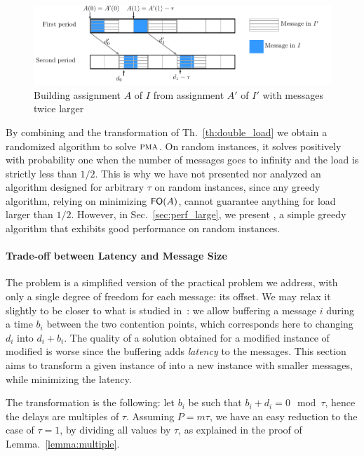 \documentclass[pdflatex,sn-mathphys,iicol]{sn-jnl}%
\theoremstyle{thmstyleone}%
\theoremstyle{thmstyletwo}%
\theoremstyle{thmstylethree}%
\begin{document}
\begin{figure}[h]
\begin{center}

\includegraphics[scale=0.7]{transfo2tau}
\end{center}
\caption{Building assignment $A$ of $I$ from assignment $A'$ of $I'$ with messages twice larger}
\label{fig:transf_2tau}
\end{figure}
 

By combining \greedyuniform and the transformation of Th.~\ref{th:double_load} we obtain a randomized algorithm to solve $\textsc{pma}$. On random instances, it solves \pma positively with probability one when the number of messages goes to infinity and the load is strictly less than $1/2$. This is why we have not presented nor analyzed an algorithm designed for arbitrary $\tau$ on random instances, since any greedy algorithm, relying on minimizing $\textsf{FO}(A)$, cannot guarantee anything for load larger than $1/2$. However, in Sec.~\ref{sec:perf_large}, we present \compactfit, a simple greedy algorithm that exhibits good performance on random instances.

\paragraph*{Trade-off between Latency and Message Size}

The problem \pma is a simplified version of the practical problem we address, with only a single degree of freedom for each message: its offset. We may relax it slightly to be closer to what is studied in~\cite{barth2018deterministic}: we allow buffering a message $i$ during a time $b_i$ between the two contention points, which corresponds here to changing $d_i$ into $d_i + b_i$. The quality of a solution obtained for a modified instance of \pma modified is worse since the buffering adds \emph{latency} to the messages. This section aims to transform a given instance of 
\pma into a new instance with smaller messages, while minimizing the latency.

The transformation is the following: let $b_i$ be such that 
 $b_i + d_i = 0 \mod \tau$, hence the delays are multiples of $\tau$. Assuming $P = m\tau$, we have an easy reduction to the case of $\tau = 1$, by dividing all values by $\tau$, as explained in the proof of Lemma.~\ref{lemma:multiple}. 
\end{document}
